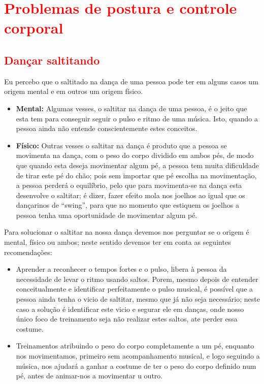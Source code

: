 \section{\textcolor{red}{ Problemas de postura e controle corporal}}

\subsection{\textcolor{red}{Dançar saltitando}}

\begin{problemT}
Eu percebo que o saltitado na dança de uma pessoa pode ter em alguns casos um origem mental e em outros um origem físico.
\begin{itemize}
\item \textbf{Mental:} Algumas vesses, o saltitar na dança de uma pessoa, 
é o jeito que esta tem para conseguir  seguir o pulso e ritmo de uma música. 
Isto, quando a pessoa ainda não entende conscientemente estes conceitos.
\item \textbf{Físico:} Outras vesses o saltitar na dança é produto que a pessoa se movimenta na dança,
com o peso do corpo dividido em ambos pés, de modo que quando esta deseja movimentar algum pé,
a pessoa tem muita dificuldade de tirar este pé do chão; 
pois sem importar que pé escolha na movimentação, a pessoa perderá o equilíbrio,
pelo que para movimenta-se na dança esta desenvolve o saltitar; é dizer, 
fazer efeito mola nos joelhos ao igual que os dançarinos de ``swing'', 
para que no momento que estiquem os joelhos a pessoa tenha uma oportunidade de movimentar algum pé.    
\end{itemize}
\end{problemT}


\begin{SolutionT}
Para solucionar o saltitar na nossa dança devemos nos perguntar se o origem é mental, físico ou ambos;
neste sentido devemos ter em conta as seguintes recomendações:
\begin{itemize}
\item  Aprender a reconhecer o tempos fortes e o pulso, 
libera à pessoa da necessidade de levar o ritmo usando saltos.
Porem, mesmo depois de entender conceitualmente e identificar perfeitamente o pulso musical,
é possível que a pessoa ainda tenha o vicio de saltitar, mesmo que já não seja necessário;
neste caso a solução é identificar este vicio e segurar ele em danças, 
onde nosso único foco de treinamento seja não realizar estes saltos, ate perder essa costume.
\item  Treinamentos atribuindo o peso do corpo completamente a um pé, 
enquanto nos movimentamos, primeiro sem acompanhamento musical,
e logo seguindo a música, 
nos ajudará a ganhar a costume de ter o peso do corpo definido num pé,
antes de animar-nos a movimentar u outro. 
\end{itemize}
\end{SolutionT}
